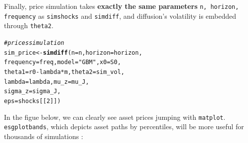 \documentclass[a4paper]{article}\usepackage[]{graphicx}\usepackage[]{color}
\makeatletter
\newcommand{\hlnum}[1]{\textcolor[rgb]{0.686,0.059,0.569}{#1}}%
\newcommand{\hlstr}[1]{\textcolor[rgb]{0.192,0.494,0.8}{#1}}%
\newcommand{\hlcom}[1]{\textcolor[rgb]{0.678,0.584,0.686}{\textit{#1}}}%
\newcommand{\hlopt}[1]{\textcolor[rgb]{0,0,0}{#1}}%
\newcommand{\hlstd}[1]{\textcolor[rgb]{0.345,0.345,0.345}{#1}}%
\newcommand{\hlkwb}[1]{\textcolor[rgb]{0.69,0.353,0.396}{#1}}%
\newcommand{\hlkwc}[1]{\textcolor[rgb]{0.333,0.667,0.333}{#1}}%
\newcommand{\hlkwd}[1]{\textcolor[rgb]{0.737,0.353,0.396}{\textbf{#1}}}%
\newenvironment{kframe}{%
 \def\at@end@of@kframe{}%
 \ifinner\ifhmode%
  \def\at@end@of@kframe{\end{minipage}}%
  \begin{minipage}{\columnwidth}%
 \fi\fi%
 \def\FrameCommand##1{\hskip\@totalleftmargin \hskip-\fboxsep
 \colorbox{shadecolor}{##1}\hskip-\fboxsep
     \hskip-\linewidth \hskip-\@totalleftmargin \hskip\columnwidth}%
 \MakeFramed {\advance\hsize-\width
   \@totalleftmargin\z@ \linewidth\hsize
   \@setminipage}}%
 {\par\unskip\endMakeFramed%
 \at@end@of@kframe}
\newenvironment{knitrout}{}{} %
\newcommand{\code}[1]{\mbox{\texttt{#1}}}
\makeatother
\begin{document}
Finally, price simulation takes {\bf exactly the same parameters} \code{n, horizon, frequency} as \code{simshocks} and \code{simdiff}, and diffusion's volatility is embedded through \code{theta2}.

\begin{knitrout}
\color{fgcolor}\begin{kframe}
\begin{alltt}
\hlcom{# prices simulation}
\hlstd{sim_price} \hlkwb{<-} \hlkwd{simdiff}\hlstd{(}\hlkwc{n} \hlstd{= n,} \hlkwc{horizon} \hlstd{= horizon,}
                     \hlkwc{frequency} \hlstd{= freq,} \hlkwc{model} \hlstd{=} \hlstr{"GBM"}\hlstd{,} \hlkwc{x0} \hlstd{= S0,}
                     \hlkwc{theta1} \hlstd{= r0} \hlopt{-} \hlstd{lambda}\hlopt{*}\hlstd{m,} \hlkwc{theta2} \hlstd{= sim_vol,}
                     \hlkwc{lambda} \hlstd{= lambda,} \hlkwc{mu_z} \hlstd{= mu_J,}
                     \hlkwc{sigma_z} \hlstd{= sigma_J,}
                     \hlkwc{eps} \hlstd{= shocks[[}\hlnum{2}\hlstd{]])}
\end{alltt}
\end{kframe}
\end{knitrout}

In the figue below, we can clearly see asset prices jumping with \code{matplot}. \code{esgplotbands}, which depicts asset paths by percentiles, will be more useful for thousands of simulations : 
\end{document}
